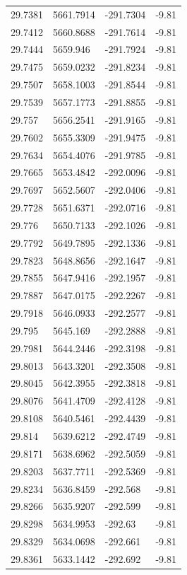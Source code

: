 \begin{table}[H]
\begin{tabular}{llll}
29.7381 & 5661.7914 & -291.7304 & -9.81 \\
29.7412 & 5660.8688 & -291.7614 & -9.81 \\
29.7444 & 5659.946 & -291.7924 & -9.81 \\
29.7475 & 5659.0232 & -291.8234 & -9.81 \\
29.7507 & 5658.1003 & -291.8544 & -9.81 \\
29.7539 & 5657.1773 & -291.8855 & -9.81 \\
29.757 & 5656.2541 & -291.9165 & -9.81 \\
29.7602 & 5655.3309 & -291.9475 & -9.81 \\
29.7634 & 5654.4076 & -291.9785 & -9.81 \\
29.7665 & 5653.4842 & -292.0096 & -9.81 \\
29.7697 & 5652.5607 & -292.0406 & -9.81 \\
29.7728 & 5651.6371 & -292.0716 & -9.81 \\
29.776 & 5650.7133 & -292.1026 & -9.81 \\
29.7792 & 5649.7895 & -292.1336 & -9.81 \\
29.7823 & 5648.8656 & -292.1647 & -9.81 \\
29.7855 & 5647.9416 & -292.1957 & -9.81 \\
29.7887 & 5647.0175 & -292.2267 & -9.81 \\
29.7918 & 5646.0933 & -292.2577 & -9.81 \\
29.795 & 5645.169 & -292.2888 & -9.81 \\
29.7981 & 5644.2446 & -292.3198 & -9.81 \\
29.8013 & 5643.3201 & -292.3508 & -9.81 \\
29.8045 & 5642.3955 & -292.3818 & -9.81 \\
29.8076 & 5641.4709 & -292.4128 & -9.81 \\
29.8108 & 5640.5461 & -292.4439 & -9.81 \\
29.814 & 5639.6212 & -292.4749 & -9.81 \\
29.8171 & 5638.6962 & -292.5059 & -9.81 \\
29.8203 & 5637.7711 & -292.5369 & -9.81 \\
29.8234 & 5636.8459 & -292.568 & -9.81 \\
29.8266 & 5635.9207 & -292.599 & -9.81 \\
29.8298 & 5634.9953 & -292.63 & -9.81 \\
29.8329 & 5634.0698 & -292.661 & -9.81 \\
29.8361 & 5633.1442 & -292.692 & -9.81 \\

\end{tabular}
\end{table}
